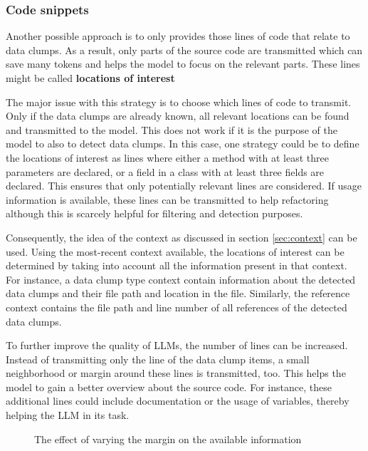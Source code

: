 \subsubsection{Code snippets}\label{sec:code_snippets}


Another possible approach is to only provides those lines of code that relate to data clumps. As a result, only parts of the source code are transmitted which can save many tokens and helps the model to focus on the relevant parts. These lines might be called \textbf{locations of interest}



The major issue with this strategy is to choose which lines of code to transmit. Only if the data clumps are already known, all relevant locations can be found and transmitted to the model. This does not work if it is the purpose of the model to also to detect data clumps. In this case, one strategy could be to define the locations of interest as lines where either a method with at least three parameters are declared, or a field in a class with at least three fields are declared. This ensures that only potentially relevant lines are considered. If usage information is available, these lines can be transmitted to help refactoring although this is scarcely helpful for filtering and detection purposes. 

Consequently, the idea of the context as discussed in section \ref{sec:context} can be used. Using the most-recent context available, the locations of interest can be determined by taking into account all the information present in that context. For instance, a data clump type context contain information about the detected data clumps and their file path and location in the file. Similarly, the reference context contains the file path and line number of all references of the detected data clumps.



To further improve the quality of \acp{LLM}, the number of lines can be increased. Instead of transmitting only the line of the data clump items,  a small neighborhood or margin around these lines is transmitted, too. This helps the model to gain a better overview about the source code. For instance, these additional lines could include documentation or the usage of variables, thereby helping the \ac{LLM} in its task.

\begin{figure}
    \centering
    
    \caption{The effect of varying the margin on the available information}
    \label{fig:margin_effect}
\end{figure}

